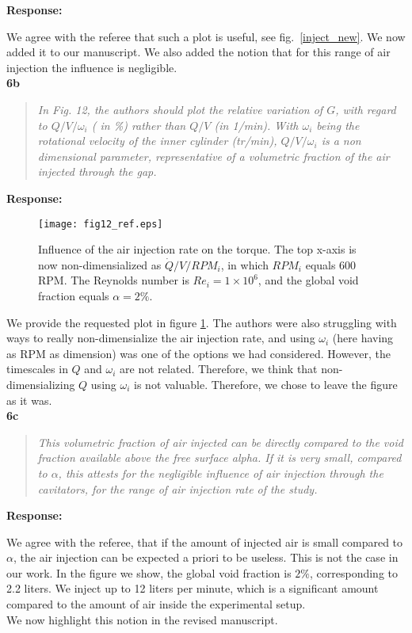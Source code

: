 \documentclass[10pt]{article}
\newcommand{\strong}[1]{\textbf{#1}}
\newcommand{\question}[1]{\begin{quote} \emph{#1}  \end{quote} }
\begin{document}
\noindent \strong{Response:} 

\noindent We agree with the referee that such a plot is useful, see fig.\ \ref{inject_new}. We now added it to our manuscript. We also added the notion that for this range of air injection the influence is negligible.\\

\noindent \strong{6b}

\question{In Fig. 12, the authors should plot the relative variation of $G$, with regard to $Q/V/\omega_i$ ( in \%) rather than $Q/V$ (in 1/min). With $\omega_i$ being the rotational velocity of the inner cylinder (tr/min), $Q/V/\omega_i$ is a non dimensional parameter, representative of a volumetric fraction of the air injected through the gap.
 }

\noindent \strong{Response:} 
\begin{figure}[htp]
\begin{center}
\texttt{[image: fig12\_ref.eps]}
\caption{Influence of the air injection rate on the torque. The top x-axis is now non-dimensialized as $\dot{Q}/V/RPM_i$, in which $RPM_i$ equals 600 RPM. The Reynolds number is $Re_i = 1 \times 10^6$, and the global void fraction equals $\alpha = 2\%$.} 
\label{fig:inject}
\end{center}
\end{figure} 
\noindent We provide the requested plot in figure \ref{fig:inject}. The authors were also struggling with ways to really non-dimensialize the air injection rate, and using $\omega_i$ (here having as RPM as dimension) was one of the options we had considered. However,  the timescales in $Q$ and $\omega_i$ are not related. Therefore, we think that non-dimensializing $Q$ using $\omega_i$ is not valuable. Therefore, we chose to leave the figure as it was.\\


\noindent \strong{6c}

\question{This volumetric fraction of air injected can be directly compared to the void fraction available above the free surface alpha. If it is very small, compared to $\alpha$, this attests for the negligible influence of air injection through the cavitators, for the range of air injection rate of the study. }

\noindent \strong{Response:} 

\noindent We agree with the referee, that if the amount of injected air is small compared to $\alpha$, the air injection can be expected a priori to be useless. This is not the case in our work. In the figure we show, the global void fraction is $2\%$, corresponding to 2.2 liters. We inject up to 12 liters per minute, which is a significant amount compared to the amount of air inside the experimental setup. \\
We now highlight this notion in the revised manuscript.\\
\\
\end{document}
